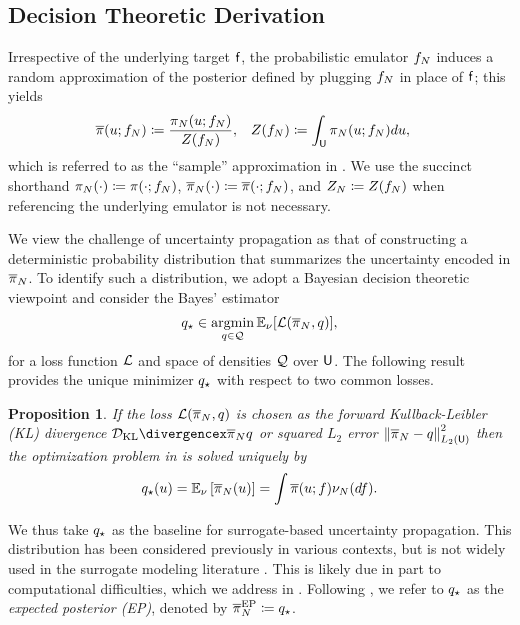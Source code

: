\documentclass[12pt]{article}
\newtheorem{prop}{Proposition}
\begin{document}
\subsection{Decision Theoretic Derivation} \label{sec:decision-theoretic}
Irrespective of the underlying target $\mathsf{f}$, the probabilistic emulator $f_{N}$ 
induces a random approximation of the posterior defined by plugging $f_{N}$
in place of $\mathsf{f}$; this yields
\begin{align}
\overline{\pi}(u; f_{N}) 
&\coloneqq \frac{\pi_{N}(u; f_{N})}{Z(f_{N})},
&&Z(f_{N}) \coloneqq \int_{\mathsf{U}} \pi_{N}(u; f_{N}) du, \label{eq:random-post}
\end{align}
which is referred to as the ``sample'' approximation in \citet{StuartTeck1}. We use the succinct
shorthand $\pi_{N}(\cdot) \coloneqq \pi(\cdot; f_{N})$, 
$\overline{\pi}_{N}(\cdot) \coloneqq \overline{\pi}(\cdot; f_{N})$, and 
$Z_{N} \coloneqq Z(f_{N})$ when referencing the underlying 
emulator is not necessary.

We view the challenge of uncertainty propagation as that of constructing a deterministic 
probability distribution that summarizes the uncertainty encoded in $\overline{\pi}_{N}$.
To identify such a distribution, we adopt a Bayesian decision theoretic viewpoint and consider
the Bayes' estimator
\begin{equation}
q_\star \in \operatorname*{argmin}_{q \in \mathcal{Q}} \mathbb{E}_{\nu_{}}[\mathcal{L}(\overline{\pi}_{N}, q)],
\label{eq:variational-opt}
\end{equation}
for a loss function $\mathcal{L}$ and space of densities $\mathcal{Q}$ over $\mathsf{U}$. The following 
result provides the unique minimizer $q_\star$ with respect to two common losses.

\begin{prop} \label{prop:EP-variational}
If the loss $\mathcal{L}(\overline{\pi}_{N}, q)$ is chosen as the forward Kullback-Leibler (KL) divergence 
$\KL{\postNormEm}{q}$ or squared $L_2$ error $\left\lVert\overline{\pi}_{N} - q\right\rVert_{L_2(\mathsf{U})}^2$
then the optimization problem in  is solved uniquely by 
\begin{equation}
q_\star(u) = 
\mathbb{E}_{\nu_{}} \left[\overline{\pi}_{N}(u) \right]
= \int \overline{\pi}(u; f) \nu_{N}(df).
\label{eq:ep-approx}
\end{equation}
\end{prop}

We thus take $q_\star$ as the baseline for surrogate-based uncertainty propagation. 
This distribution has been considered previously in various 
contexts, but is not widely used in the surrogate modeling literature
\citep{trainDynamics,BurknerSurrogate,garegnani2021NoisyMCMC}.
This is likely due in part to computational difficulties, which we address in .
Following \citet{BurknerSurrogate}, we refer to $q_\star$ as the \textit{expected posterior (EP)},
denoted by $\overline{\pi}_{N}^{\mathrm{EP}} \coloneqq q_\star$.
\end{document}

